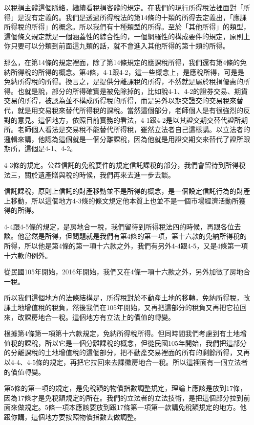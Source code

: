 \documentclass[]{ctexbook}
\begin{document}
以稅捐主體這個脈絡，繼續看稅捐客體的規定。在我們的現行所得稅法裡面對「所得」是沒有定義的。我們是透過所得稅法的第14條的十類的所得去定義出，「應課所得稅的所得」的概念。所以我們有十種類型的所得。至於「其他所得」的類型，這個條文規定就是一個涵蓋性的綜合性的，一個網羅性的構成要件的規定，原則上你只要可以分類到前面這九類的話，就不會進入其他所得的第十類的所得。

那么，在第14條的規定裡面，除了第14條規定的應課稅所得，我們還有第4條的免納所得稅的所得的概念。第4條，4-1跟4-2，這一些概念上，是應稅所得，可是是免納所得稅的所得。換言之，是提供分離課稅的所得，不然就是屬於稅捐優惠的所得。也就是說，部分的所得確實是被免除掉的，比如說4-1、4-2的證券交易、期貨交易的所得，被認為並不構成所得稅的所得，而是另外以期交證交的交易稅來替代，就是用交易稅來替代所得稅的課稅。當然這個部分，老師個人是有很強烈的反對的意見。這個地方，依照目前實務的看法，4-1跟4-2是以其證交期交替代證所期所。老師個人看法是交易稅不能替代所得稅，雖然立法者自己這樣講。以立法者的邏輯來講，他認為這個就是一個分離課稅，因為他就是用證交期交來替代了證所跟期所，這個是4-1、4-2。

4-3條的規定。公益信託的免稅要件的規定信託課稅的部分，我們會留待到所得稅法三，關於遺產贈與稅的時候，我們再來去進一步去談。

信託課稅，原則上信託的財產移動並不是所得的概念，是一個設定信託行為的財產上移動，所以這個地方4-3條的條文規定他本質上也並不是一個市場經濟活動所獲得的所得。

4-4跟4-5條的規定，是房地合一稅，我們留待到所得稅法四的時候，再跟各位去談。他當然是所得，但問題就是我們有第4條的第一項，第十六款的免納所得稅的所得，所以他是第4條的第一項十六款之外，我們有另外4-4跟4-5，又是4條第一項十六款的例外。

從民國105年開始，2016年開始，我們又在4條一項十六款之外，另外加徵了房地合一稅。

所以我們這個地方的法條結構是，所得稅對於不動產土地的移轉，免納所得稅，改課土地增值稅的稅負，然後我們在105年開始，又再把這部分的稅負又再把它拉回來，改課房地合一稅。這個地方有立法上的價值的轉變。

根據第4條第一項第十六款規定，免納所得稅所得。但同時間我們考慮到有土地增值稅的課稅，所以它是一個分離課稅的概念，但從民國105年開始，我們把這部分的分離課稅的土地增值稅的這個部分，把不動產交易裡面的所有的剩餘所得，又再以4-4、4-5條的規定，再把它拉回來去課徵房地合一稅。所以這裡面有一個立法者的價值轉變。

第5條的第一項的規定，是免稅額的物價指數調整規定，理論上應該是放到17條，因為17條才是免稅額規定的所在。我們的立法者的立法技術，是把這個部分拉到前面來做規定。5條一項本應該要放到跟17條第一項第一款講免稅額規定的地方。他跟你講，這個地方要按照物價指數去做調整。
\end{document}
